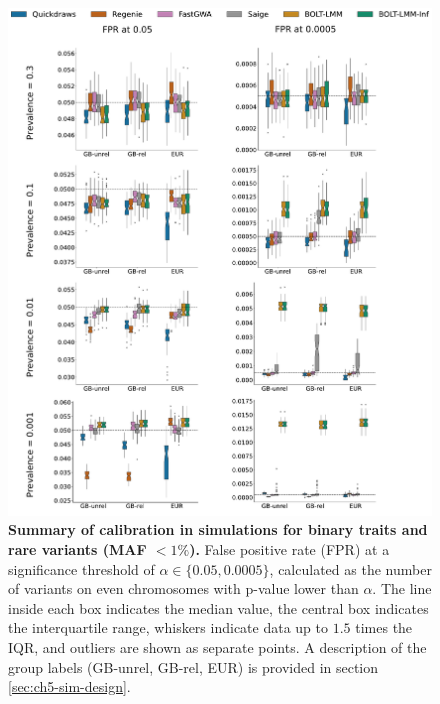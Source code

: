 \begin{figure}[h!]
    \centering
    \includegraphics[width=\textwidth]{figures/sim_calibration/bt_fpr_rare.pdf}
    \caption{\textbf{Summary of calibration in simulations for binary traits and rare variants (MAF $< 1\%$).}
    False positive rate (FPR) at a significance threshold of $\alpha \in \{0.05, 0.0005\}$, calculated as the number of variants on even chromosomes with p-value lower than $\alpha$.
    The line inside each box indicates the median value, the central box indicates the interquartile range, whiskers indicate data up to $1.5$ times the IQR, and outliers are shown as separate points.
    A description of the group labels (GB-unrel, GB-rel, EUR) is provided in section \ref{sec:ch5-sim-design}.
    \label{fig:qd_sim_fpr_bt2}
    }
\end{figure}

